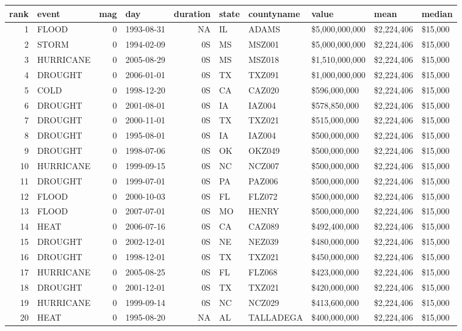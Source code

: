 \documentclass[]{article}
\newenvironment{Shaded}{\begin{snugshade}}{\end{snugshade}}
\newcommand{\DecValTok}[1]{\textcolor[rgb]{0.00,0.00,0.81}{{#1}}}
\newcommand{\StringTok}[1]{\textcolor[rgb]{0.31,0.60,0.02}{{#1}}}
\newcommand{\NormalTok}[1]{{#1}}
\begin{document}
\begin{longtable}[]{@{}rlrlrlllll@{}}
\toprule
rank & event & mag & day & duration & state & countyname & value & mean
& median\tabularnewline
\midrule
\endhead
1 & FLOOD & 0 & 1993-08-31 & NA & IL & ADAMS & \$5,000,000,000 &
\$2,224,406 & \$15,000\tabularnewline
2 & STORM & 0 & 1994-02-09 & 0S & MS & MSZ001 & \$5,000,000,000 &
\$2,224,406 & \$15,000\tabularnewline
3 & HURRICANE & 0 & 2005-08-29 & 0S & MS & MSZ018 & \$1,510,000,000 &
\$2,224,406 & \$15,000\tabularnewline
4 & DROUGHT & 0 & 2006-01-01 & 0S & TX & TXZ091 & \$1,000,000,000 &
\$2,224,406 & \$15,000\tabularnewline
5 & COLD & 0 & 1998-12-20 & 0S & CA & CAZ020 & \$596,000,000 &
\$2,224,406 & \$15,000\tabularnewline
6 & DROUGHT & 0 & 2001-08-01 & 0S & IA & IAZ004 & \$578,850,000 &
\$2,224,406 & \$15,000\tabularnewline
7 & DROUGHT & 0 & 2000-11-01 & 0S & TX & TXZ021 & \$515,000,000 &
\$2,224,406 & \$15,000\tabularnewline
8 & DROUGHT & 0 & 1995-08-01 & 0S & IA & IAZ004 & \$500,000,000 &
\$2,224,406 & \$15,000\tabularnewline
9 & DROUGHT & 0 & 1998-07-06 & 0S & OK & OKZ049 & \$500,000,000 &
\$2,224,406 & \$15,000\tabularnewline
10 & HURRICANE & 0 & 1999-09-15 & 0S & NC & NCZ007 & \$500,000,000 &
\$2,224,406 & \$15,000\tabularnewline
11 & DROUGHT & 0 & 1999-07-01 & 0S & PA & PAZ006 & \$500,000,000 &
\$2,224,406 & \$15,000\tabularnewline
12 & FLOOD & 0 & 2000-10-03 & 0S & FL & FLZ072 & \$500,000,000 &
\$2,224,406 & \$15,000\tabularnewline
13 & FLOOD & 0 & 2007-07-01 & 0S & MO & HENRY & \$500,000,000 &
\$2,224,406 & \$15,000\tabularnewline
14 & HEAT & 0 & 2006-07-16 & 0S & CA & CAZ089 & \$492,400,000 &
\$2,224,406 & \$15,000\tabularnewline
15 & DROUGHT & 0 & 2002-12-01 & 0S & NE & NEZ039 & \$480,000,000 &
\$2,224,406 & \$15,000\tabularnewline
16 & DROUGHT & 0 & 1998-12-01 & 0S & TX & TXZ021 & \$450,000,000 &
\$2,224,406 & \$15,000\tabularnewline
17 & HURRICANE & 0 & 2005-08-25 & 0S & FL & FLZ068 & \$423,000,000 &
\$2,224,406 & \$15,000\tabularnewline
18 & DROUGHT & 0 & 2001-12-01 & 0S & TX & TXZ021 & \$420,000,000 &
\$2,224,406 & \$15,000\tabularnewline
19 & HURRICANE & 0 & 1999-09-14 & 0S & NC & NCZ029 & \$413,600,000 &
\$2,224,406 & \$15,000\tabularnewline
20 & HEAT & 0 & 1995-08-20 & NA & AL & TALLADEGA & \$400,000,000 &
\$2,224,406 & \$15,000\tabularnewline
\bottomrule
\end{longtable}

\begin{Shaded}
\end{Shaded}
\end{document}
